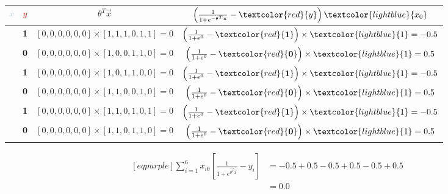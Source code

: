 \begin{table}[H]
	\centering
	\caption{}
	\label{tab:training-0}
	\begin{tabular}{*{4}{|c}|}
		\hline
		\textcolor{lightblue}{$x$} & \textcolor{red}{$y$} & $\theta^{T}\vec{x}$ & $\left( \frac{1}{1 + e^{-\vec{\theta}^{T}\vec{x}} } - \textcolor{red}{y} \right) \textcolor{lightblue}{x_{0}}$\\
		\hline
		[1, 1, 1, 0, 1, 1] & \textbf{1} & $[0, 0, 0, 0, 0, 0] \times [1, 1, 1, 0, 1, 1] = 0$ & $\left( \frac{1}{1 + e^{0}} - \textcolor{red}{\mathbf{1}} \right) \times \textcolor{lightblue}{1} = -0.5$\\
		\hline
		[1, 0, 0, 1, 1, 0] & \textbf{0} & $[0, 0, 0, 0, 0, 0] \times [1, 0, 0, 1, 1, 0] = 0$ & $\left( \frac{1}{1 + e^{0}} - \textcolor{red}{\mathbf{0}} \right) \times \textcolor{lightblue}{1} = 0.5$\\
		\hline
		[1, 0, 1, 1, 0, 0] & \textbf{1} & $[0, 0, 0, 0, 0, 0] \times [1, 0, 1, 1, 0, 0] = 0$ & $\left( \frac{1}{1 + e^{0}} - \textcolor{red}{\mathbf{1}} \right) \times \textcolor{lightblue}{1} = -0.5$\\
		\hline
		[1, 1, 0, 0, 1, 0] & \textbf{0} & $[0, 0, 0, 0, 0, 0] \times [1, 1, 0, 0, 1, 0] = 0$ & $\left( \frac{1}{1 + e^{0}} - \textcolor{red}{\mathbf{0}} \right) \times \textcolor{lightblue}{1} = 0.5$\\
		\hline
		[1, 1, 0, 1, 0, 1] & \textbf{1} & $[0, 0, 0, 0, 0, 0] \times [1, 1, 0, 1, 0, 1] = 0$ & $\left( \frac{1}{1 + e^{0}} - \textcolor{red}{\mathbf{1}} \right) \times \textcolor{lightblue}{1} = -0.5$\\
		\hline
		[1, 1, 0, 1, 1, 0] & \textbf{0} & $[0, 0, 0, 0, 0, 0] \times [1, 1, 0, 1, 1, 0] = 0$ & $\left( \frac{1}{1 + e^{0}} - \textcolor{red}{\mathbf{0}} \right) \times \textcolor{lightblue}{1} = 0.5$\\
		\hline
	\end{tabular}
\end{table}
\begin{equation*}
\begin{aligned}[eqpurple]
	\sum_{i=1}^6 x_{i0} \left[ \frac{1}{ 1 + e^{\vec{\theta^{T}}\vec{x}}} - y_{i} \right] &= -0.5 + 0.5 - 0.5 + 0.5 - 0.5 + 0.5 \\
&= 0.0
\end{aligned}
\end{equation*}
